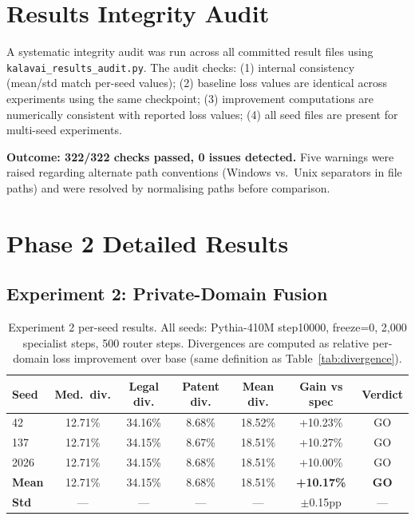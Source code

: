 \documentclass{article}
\begin{document}
\section{Results Integrity Audit}
\label{app:audit}

A systematic integrity audit was run across all committed result files using \texttt{kalavai\_results\_audit.py}. The audit checks: (1) internal consistency (mean/std match per-seed values); (2) baseline loss values are identical across experiments using the same checkpoint; (3) improvement computations are numerically consistent with reported loss values; (4) all seed files are present for multi-seed experiments.

\textbf{Outcome: 322/322 checks passed, 0 issues detected.} Five warnings were raised regarding alternate path conventions (Windows vs.\ Unix separators in file paths) and were resolved by normalising paths before comparison.

\section{Phase 2 Detailed Results}
\label{app:phase2}

\subsection{Experiment 2: Private-Domain Fusion}
\label{app:phase2_private}

\begin{table}[h]
\centering
\caption{Experiment 2 per-seed results. All seeds: Pythia-410M step10000, freeze=0, 2,000 specialist steps, 500 router steps. Divergences are computed as relative per-domain loss improvement over base (same definition as Table~\ref{tab:divergence}).}
\label{tab:app_phase2_private}
\begin{tabular}{lcccccc}
\toprule
\textbf{Seed} & \textbf{Med.\ div.} & \textbf{Legal div.} & \textbf{Patent div.} & \textbf{Mean div.} & \textbf{Gain vs spec} & \textbf{Verdict} \\
\midrule
42   & 12.71\% & 34.16\% & 8.68\% & 18.52\% & +10.23\% & GO \\
137  & 12.71\% & 34.15\% & 8.67\% & 18.51\% & +10.27\% & GO \\
2026 & 12.71\% & 34.15\% & 8.68\% & 18.51\% & +10.00\% & GO \\
\midrule
\textbf{Mean} & 12.71\% & 34.15\% & 8.68\% & 18.51\% & \textbf{+10.17\%} & \textbf{GO} \\
\textbf{Std}  & ---     & ---     & ---    & ---     & $\pm$0.15pp & --- \\
\bottomrule
\end{tabular}
\end{table}
\end{document}
